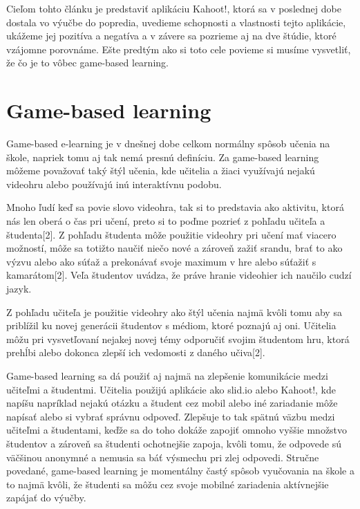 \documentclass[10pt,oneside,slovak,a4paper]{article}
\begin{document}
	Cieľom tohto článku je predstaviť aplikáciu Kahoot!, ktorá sa v poslednej dobe dostala vo výučbe do popredia, uvedieme schopnosti a vlastnosti tejto aplikácie, ukážeme jej pozitíva a negatíva a v závere sa pozrieme aj na dve štúdie, ktoré vzájomne porovnáme. Ešte predtým ako si toto cele povieme si musíme vysvetliť, že čo je to vôbec game-based learning. 






\section{Game-based learning} \label{ml}

Game-based e-learning je v dnešnej dobe celkom normálny spôsob učenia na škole, napriek tomu aj tak nemá presnú definíciu. Za game-based learning môžeme považovať taký štýl učenia, kde učitelia a žiaci využívajú nejakú videohru alebo používajú inú interaktívnu podobu. 
	
	Mnoho ľudí keď sa povie slovo videohra, tak si to predstavia ako aktivitu, ktorá nás len oberá o čas pri učení, preto si to poďme pozrieť z pohľadu učiteľa a študenta[2]. Z pohľadu študenta môže použitie videohry pri učení mať viacero možností, môže sa totižto naučiť niečo nové a zároveň zažiť srandu, brať to ako výzvu alebo ako súťaž a prekonávať svoje maximum v hre alebo súťažiť s kamarátom[2]. Veľa študentov uvádza, že práve hranie videohier ich naučilo cudzí jazyk. 
	
	Z pohľadu učiteľa je použitie videohry ako štýl učenia najmä kvôli tomu aby sa priblížil ku novej generácii študentov s médiom, ktoré poznajú aj oni. Učitelia môžu pri vysvetľovaní nejakej novej témy odporučiť svojim študentom hru, ktorá prehĺbi alebo dokonca zlepší ich vedomosti z daného učiva[2]. 
	
	Game-based learning sa dá použiť aj najmä na zlepšenie komunikácie medzi učiteľmi a študentmi. Učitelia použijú aplikácie ako slid.io alebo Kahoot!, kde napíšu napríklad nejakú otázku a študent cez mobil alebo iné zariadanie môže napísať alebo si vybrať správnu odpoveď. Zlepšuje to tak spätnú väzbu medzi učiteľmi a študentami, keďže sa do toho dokáže zapojiť omnoho vyššie množstvo študentov a zároveň sa študenti ochotnejšie zapoja, kvôli tomu, že odpovede sú väčšinou anonymné a nemusia sa báť výsmechu pri zlej odpovedi. 
	Stručne povedané, game-based learning je momentálny častý spôsob vyučovania na škole a to najmä kvôli, že študenti sa môžu cez svoje mobilné zariadenia aktívnejšie zapájať do výučby.
\end{document}
